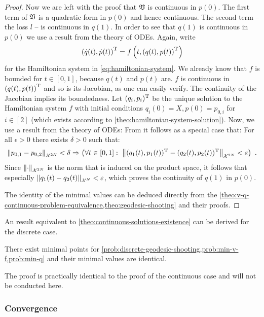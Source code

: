 \begin{proof}
	Now we are left with the proof that $\mathfrak{V}$ is continuous in $p(0)$.
	The first term of $\mathfrak{V}$ is a quadratic form in $p(0)$ and hence continuous.
	The second term -- the loss $l$ -- is continuous in $q(1)$.
	In order to see that $q(1)$ is continuous in $p(0)$ we use a result from the theory of ODEs.
	Again, write
	\begin{equation}
		\left(\dot{q}(t), \dot{p}(t)\right)^{\mathrm{T}} = f\left(t, \left(q(t), p(t)\right)^{\mathrm{T}} \right)
	\end{equation}
	for the Hamiltonian system in \cref{eq:hamiltonian-system}.
	We already know that $f$ is bounded for $t \in [0, 1]$, because $q(t)$ and $p(t)$ are.
	$f$ is continuous in $\left(q(t), p(t)\right)^{\mathrm{T}}$ and so is its Jacobian, as one can easily verify.
	The continuity of the Jacobian implies its boundedness.
	Let $(q_i, p_i)^{\mathrm{T}}$ be the unique solution to the Hamiltonian system $f$ with initial conditions $q_i(0) = X, p(0) = p_{0, i}$ for $i \in [2]$ (which exists according to \cref{theo:hamiltonian-system-solution}).
	Now, we use a result from the theory of ODEs:
	From \cite[Theorem~1.4.1]{arino06} it follows as a special case that:
	For all $\epsilon > 0$ there exists $\delta > 0$ such that:
	\begin{equation}
		\norm{p_{0, 1} - p_{0, 2}}_{\mathcal{X}^{2N}} < \delta \Rightarrow 
		\left(\forall t \in [0, 1]:\ \norm{(q_1(t), p_1(t))^{\mathrm{T}} - (q_2(t), p_2(t))^{\mathrm{T}}}_{\mathcal{X}^{2N}} < \varepsilon \right) \ .
	\end{equation}
	Since $\norm{\cdot}_{\mathcal{X}^{2N}}$ is the norm that is induced on the product space, it follows that especially $\norm{q_1(t) - q_2(t)}_{\mathcal{X}^N} < \varepsilon$, which proves the continuity of $q(1)$ in $p(0)$.
	
	The identity of the minimal values can be deduced directly from the \cref{theo:v-q-continuous-problem-equivalence,theo:geodesic-shooting} and their proofs.
\end{proof}

An result equivalent to \cref{theo:continuous-solutions-existence} can be derived for the discrete case.
\begin{theorem}
	\label{theo:discrete-solutions-existence}
	There exist minimal points for \cref{prob:discrete-geodesic-shooting,prob:min-v-f,prob:min-q} and their minimal values are identical.
\end{theorem}
The proof is practically identical to the proof of the continuous case and will not be conducted here.

\subsubsection{Convergence}

